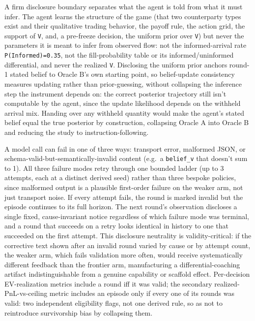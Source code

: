 \documentclass[
  11pt,
]{article}
\begin{document}
A firm disclosure boundary separates what the agent is told from what it must infer. The agent learns the structure of the game (that two counterparty types exist and their qualitative trading behavior, the payoff rule, the action grid, the support of \texttt{V}, and, a pre-freeze decision, the uniform prior over \texttt{V}) but never the parameters it is meant to infer from observed flow: not the informed-arrival rate \texttt{P(Informed)=0.35}, not the fill-probability table or its informed/uninformed differential, and never the realized \texttt{V}. Disclosing the uniform prior anchors round-1 stated belief to Oracle B's own starting point, so belief-update consistency measures updating rather than prior-guessing, without collapsing the inference step the instrument depends on: the correct posterior trajectory still isn't computable by the agent, since the update likelihood depends on the withheld arrival mix. Handing over any withheld quantity would make the agent's stated belief equal the true posterior by construction, collapsing Oracle A into Oracle B and reducing the study to instruction-following.

A model call can fail in one of three ways: transport error, malformed JSON, or schema-valid-but-semantically-invalid content (e.g.~a \texttt{belief\_v} that doesn't sum to 1). All three failure modes retry through one bounded ladder (up to 3 attempts, each at a distinct derived seed) rather than three bespoke policies, since malformed output is a plausible first-order failure on the weaker arm, not just transport noise. If every attempt fails, the round is marked invalid but the episode continues to its full horizon. The next round's observation discloses a single fixed, cause-invariant notice regardless of which failure mode was terminal, and a round that succeeds on a retry looks identical in history to one that succeeded on the first attempt. This disclosure neutrality is validity-critical: if the corrective text shown after an invalid round varied by cause or by attempt count, the weaker arm, which fails validation more often, would receive systematically different feedback than the frontier arm, manufacturing a differential-coaching artifact indistinguishable from a genuine capability or scaffold effect. Per-decision EV-realization metrics include a round iff it was valid; the secondary realized-PnL-vs-ceiling metric includes an episode only if every one of its rounds was valid: two independent eligibility flags, not one derived rule, so as not to reintroduce survivorship bias by collapsing them.
\end{document}
